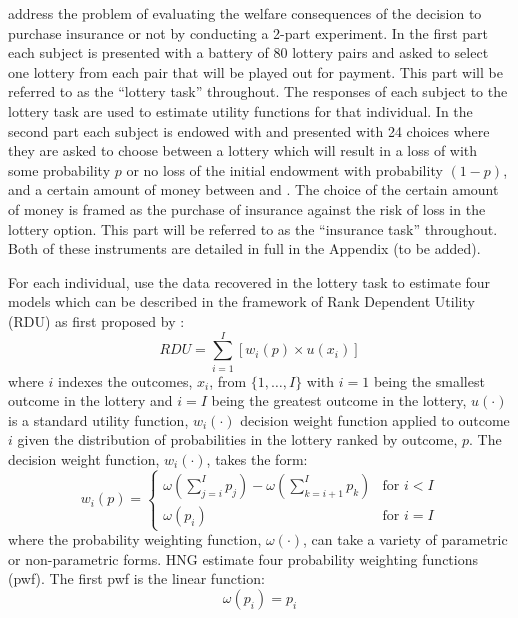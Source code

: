 \documentclass[../main.tex]{subfiles}
\begin{document}
\textcite{Harrison2016} address the problem of evaluating the welfare consequences of the decision to purchase insurance or not by conducting a 2-part experiment.
In the first part each subject is presented with a battery of 80 lottery pairs and asked to select one lottery from each pair that will be played out for payment.
This part will be referred to as the \enquote{lottery task} throughout.
The responses of each subject to the lottery task are used to estimate utility functions for that individual.
In the second part each subject is endowed with  and presented with 24 choices where they are asked to choose between a lottery which will result in a loss of  with some probability $p$ or no loss of the initial endowment with probability $(1-p)$, and a certain amount of money between  and .
The choice of the certain amount of money is framed as the purchase of insurance against the risk of loss in the lottery option.
This part will be referred to as the \enquote{insurance task} throughout.
Both of these instruments are detailed in full in the Appendix (to be added).

For each individual, \textcite{Harrison2016} use the data recovered in the lottery task to estimate four models which can be described in the framework of Rank Dependent Utility (RDU) as first proposed by \textcite{Quiggin1982}:
\begin{equation}
	\label{eq4:RDU}
	RDU = \sum_{i=1}^{I} \left[ w_i(p) \times u(x_i) \right]
\end{equation}
\noindent where $i$ indexes the outcomes, $x_i$, from $\{1,\ldots,I\}$ with $i=1$ being the smallest outcome in the lottery and $i=I$ being the greatest outcome in the lottery, $u(\cdot)$ is a standard utility function, $w_i(\cdot)$ decision weight function applied to outcome $i$ given the distribution of probabilities in the lottery ranked by outcome, $p$.
The decision weight function, $w_i(\cdot)$, takes the form:
\begin{equation}
	\label{eq4:dweight}
	w_i(p) =
	\begin{cases}
		\omega\left(\displaystyle\sum_{j=i}^I p_j\right) - \omega\left(\displaystyle\sum_{k=i+1}^I p_k\right) & \text{for } i<I \\
		\omega(p_i) & \text{for } i = I
	\end{cases}
\end{equation}
\noindent where the probability weighting function, $\omega(\cdot)$, can take a variety of parametric or non-parametric forms.
HNG estimate four probability weighting functions (pwf).
The first pwf is the linear function:
\begin{equation}
	\label{eq4:pw:eut}
	\omega(p_i) = p_i
\end{equation}
\end{document}
